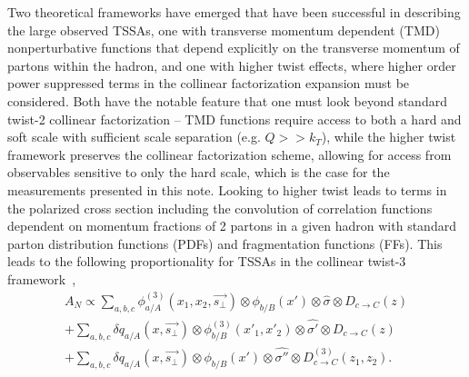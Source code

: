 \documentclass[submission, Proceedings]{SciPost}
\begin{document}
Two theoretical frameworks have emerged that have been successful in describing the large observed TSSAs, one with transverse momentum dependent (TMD) nonperturbative functions that depend explicitly on the transverse momentum of partons within the hadron, and one with higher twist effects, where higher order power suppressed terms in the collinear factorization expansion must be considered. Both have the notable feature that one must look beyond standard twist-2 collinear factorization -- TMD functions require access to both a hard and soft scale with sufficient scale separation (e.g. $Q>>k_{T}$), while the higher twist framework preserves the collinear factorization scheme, allowing for access from observables sensitive to only the hard scale, which is the case for the measurements presented in this note. Looking to higher twist leads to terms in the polarized cross section including the convolution of correlation functions dependent on momentum fractions of 2 partons in a given hadron with standard parton distribution functions (PDFs) and fragmentation functions (FFs). This leads to the following proportionality for TSSAs in the collinear twist-3 framework~\cite{forwardjpsi},
\begin{equation}
	\begin{aligned}
	    A_{N} \propto	\sum_{a,b,c}\phi^{(3)}_{a/A} (x_{1},x_{2},\vec{s_{\perp}}) \otimes \phi_{b/B} (x') \otimes \hat{\sigma} \otimes D_{c \rightarrow C}(z) \\ + \sum_{a,b,c} \delta q_{a/A} (x,\vec{s_{\perp}}) \otimes\phi^{(3)}_{b/B} (x'_{1},x'_{2}) \otimes \hat{\sigma '}\otimes D_{c \rightarrow C} (z) \\ + \sum_{a,b,c} \delta q_{a/A} (x,\vec{s_{\perp}}) \otimes \phi_{b/B} (x') \otimes \hat{\sigma ''} \otimes D^{(3)}_{c \rightarrow C} (z_{1},z_{2}). 	   
	\end{aligned}\label{eqn:AN_twist3}            
\end{equation}
\end{document}
